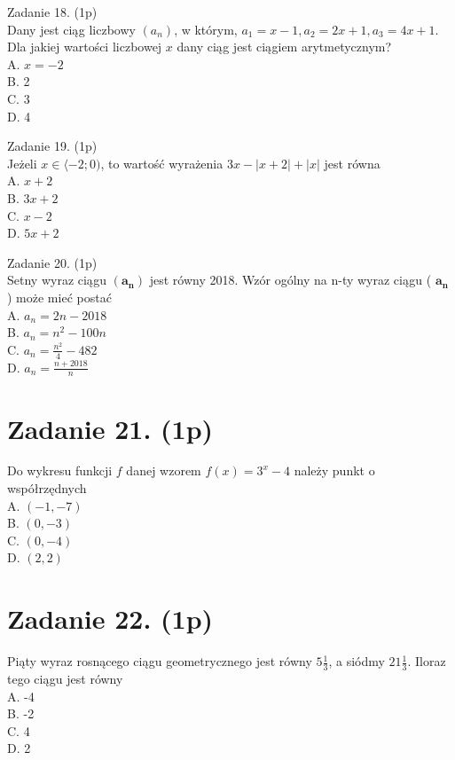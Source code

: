\documentclass[10pt]{article}
\begin{document}
Zadanie 18. (1p)\\
Dany jest ciąg liczbowy \(\left(a_{n}\right)\), w którym, \(a_{1}=x-1, a_{2}=2 x+1, a_{3}=4 x+1\).\\
Dla jakiej wartości liczbowej \(x\) dany ciąg jest ciągiem arytmetycznym?\\
A. \(x=-2\)\\
B. 2\\
C. 3\\
D. 4

Zadanie 19. (1p)\\
Jeżeli \(x \in\langle-2 ; 0)\), to wartość wyrażenia \(3 x-|x+2|+|x|\) jest równa\\
A. \(x+2\)\\
B. \(3 x+2\)\\
C. \(x-2\)\\
D. \(5 x+2\)

Zadanie 20. (1p)\\
Setny wyraz ciągu \(\left(\boldsymbol{a}_{\boldsymbol{n}}\right)\) jest równy 2018. Wzór ogólny na n-ty wyraz ciągu ( \(\boldsymbol{a}_{\boldsymbol{n}}\) ) może mieć postać\\
A. \(a_{n}=2 n-2018\)\\
B. \(a_{n}=n^{2}-100 n\)\\
C. \(a_{n}=\frac{n^{2}}{4}-482\)\\
D. \(a_{n}=\frac{n+2018}{n}\)

\section*{Zadanie 21. (1p)}
Do wykresu funkcji \(f\) danej wzorem \(f(x)=3^{x}-4\) należy punkt o współrzędnych\\
A. \((-1,-7)\)\\
B. \((0,-3)\)\\
C. \((0,-4)\)\\
D. \((2,2)\)

\section*{Zadanie 22. (1p)}
Piąty wyraz rosnącego ciągu geometrycznego jest równy \(5 \frac{1}{3}\), a siódmy \(21 \frac{1}{3}\). Iloraz tego ciągu jest równy\\
A. -4\\
B. -2\\
C. 4\\
D. 2
\end{document}
